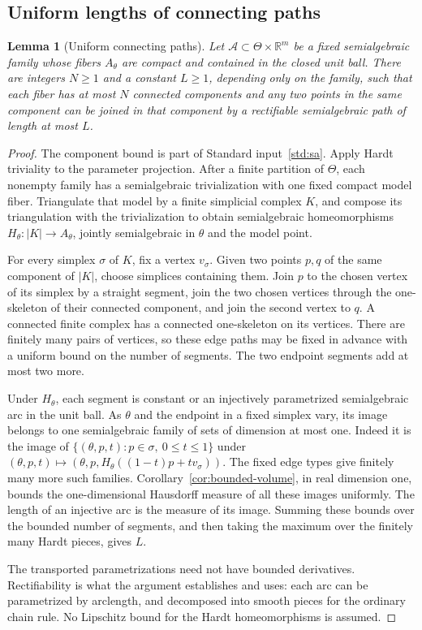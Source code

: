 \documentclass[11pt]{article}
\numberwithin{equation}{section}
\newtheorem{lemma}[theorem]{Lemma}
\theoremstyle{definition}
\theoremstyle{remark}
\newcommand{\R}{\mathbb R}
\begin{document}
\subsection{Uniform lengths of connecting paths}
\begin{lemma}[Uniform connecting paths]\label{lem:connecting-paths}
Let $\mathcal A\subset\Theta\times\R^m$ be a fixed semialgebraic family
whose fibers $A_\theta$ are compact and contained in the closed unit ball.
There are integers $N\ge1$ and a constant $L\ge1$, depending only on the
family, such that each fiber has at most $N$ connected components and any
two points in the same component can be joined in that component by a
rectifiable semialgebraic path of length at most $L$.
\end{lemma}
\begin{proof}
The component bound is part of Standard input~\ref{std:sa}. Apply Hardt
triviality to the parameter projection. After a finite partition of
$\Theta$, each nonempty family has a semialgebraic trivialization with
one fixed compact model fiber. Triangulate that model by a finite
simplicial complex $K$, and compose its triangulation with the
trivialization to obtain semialgebraic homeomorphisms
$H_\theta:|K|\to A_\theta$, jointly semialgebraic in $\theta$ and the
model point.

For every simplex $\sigma$ of $K$, fix a vertex $v_\sigma$. Given two
points $p,q$ of the same component of $|K|$, choose simplices containing
them. Join $p$ to the chosen vertex of its simplex by a straight segment,
join the two chosen vertices through the one-skeleton of their connected
component, and join the second vertex to $q$. A connected finite complex
has a connected one-skeleton on its vertices. There are finitely many
pairs of vertices, so these edge paths may be fixed in advance with a
uniform bound on the number of segments. The two endpoint segments add
at most two more.

Under $H_\theta$, each segment is constant or an injectively parametrized
semialgebraic arc in the unit ball. As $\theta$ and the endpoint in a
fixed simplex vary, its image belongs to one semialgebraic family of
sets of dimension at most one. Indeed it is the image of
$\{(\theta,p,t):p\in\sigma,\ 0\le t\le1\}$ under
$(\theta,p,t)\mapsto(\theta,p,H_\theta((1-t)p+tv_\sigma))$.
The fixed edge types give finitely many more such families.
Corollary~\ref{cor:bounded-volume}, in real dimension one, bounds the
one-dimensional Hausdorff measure of all these images uniformly.
The length of an injective arc is the measure of its image. Summing
these bounds over the bounded number of segments, and then taking the
maximum over the finitely many Hardt pieces, gives $L$.

The transported parametrizations need not have bounded derivatives.
Rectifiability is what the argument establishes and uses: each arc can
be parametrized by arclength, and decomposed into smooth pieces for the
ordinary chain rule. No Lipschitz bound for the Hardt homeomorphisms is
assumed.
\end{proof}
\end{document}
